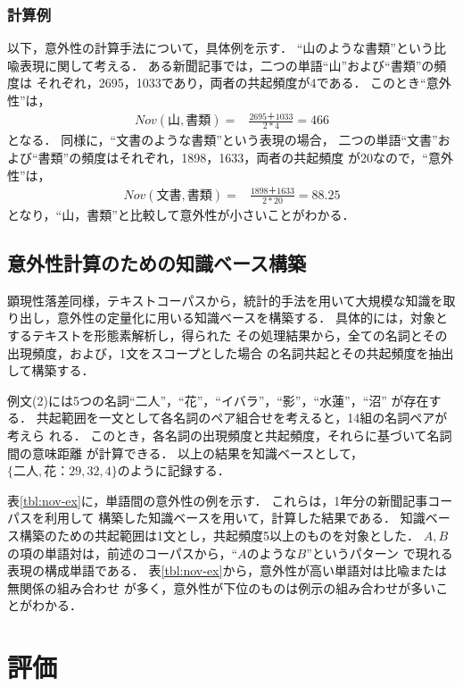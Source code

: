\subsubsection*{計算例}
以下，意外性の計算手法について，具体例を示す．
``山のような書類''という比喩表現に関して考える．
ある新聞記事\cite{Mainichi1995j}では，二つの単語``山''および``書類''の頻度は
それぞれ，2695，1033であり，両者の共起頻度が4である．
このとき``意外性''は，
\begin{eqnarray}
\label{calc:novelty1}
Nov(山,書類) = & \frac{2695＋1033}{2{\ast}4} = 466
\end{eqnarray}
となる．
同様に，``文書のような書類''という表現の場合，
二つの単語``文書''および``書類''の頻度はそれぞれ，1898，1633，両者の共起頻度
が20なので，``意外性''は，
\begin{eqnarray}
\label{calc:novelty2}
Nov(文書,書類) = & \frac{1898＋1633}{2{\ast}20} = 88.25
\end{eqnarray}
となり，``山，書類''と比較して意外性が小さいことがわかる．

\subsection{意外性計算のための知識ベース構築}
顕現性落差同様，テキストコーパスから，統計的手法を用いて大規模な知識を取
り出し，意外性の定量化に用いる知識ベースを構築する．
具体的には，対象とするテキストを形態素解析\cite{Chasen1999j}し，得られた
その処理結果から，全ての名詞とその出現頻度，および，1文をスコープとした場合
の名詞共起とその共起頻度を抽出して構築する．

例文(2)には5つの名詞``二人''，``花''，``イバラ''，``影''，``水蓮''，``沼''
が存在する．
共起範囲を一文として各名詞のペア組合せを考えると，14組の名詞ペアが考えら
れる．
このとき，各名詞の出現頻度と共起頻度，それらに基づいて名詞間の意味距離
が計算できる．
以上の結果を知識ベースとして，$\{二人,花：29,32,4\}$のように記録する．


表\ref{tbl:nov-ex}に，単語間の意外性の例を示す．
これらは，1年分の新聞記事コーパス\cite{Mainichi1995j}を利用して
構築した知識ベースを用いて，計算した結果である．
知識ベース構築のための共起範囲は1文とし，共起頻度5以上のものを対象とした．
$A,B$の項の単語対は，前述のコーパスから，``$AのようなB$''というパターン
で現れる表現の構成単語である．
表\ref{tbl:nov-ex}から，意外性が高い単語対は比喩または無関係の組み合わせ
が多く，意外性が下位のものは例示の組み合わせが多いことがわかる．

\section{評価}
